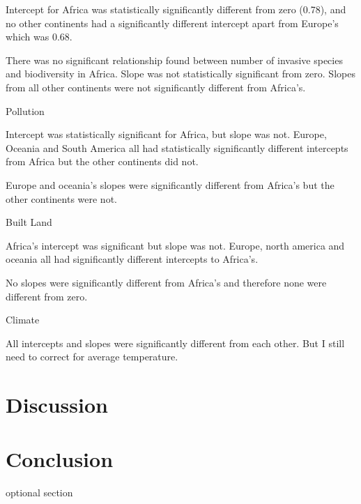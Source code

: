 \documentclass[11pt, a4paper, titlepage]{article}
\begin{document}
Intercept for Africa was statistically significantly different from zero (0.78), and no other continents had a significantly different intercept apart from Europe's which was 0.68. 

There was no significant relationship found between number of invasive species and biodiversity in Africa. Slope was not statistically significant from zero. Slopes from all other continents were not significantly different from Africa's. \newline

Pollution \newline

Intercept was statistically significant for Africa, but slope was not. Europe, Oceania and South America all had statistically significantly different intercepts from Africa but the other continents did not.

Europe and oceania's slopes were significantly different from Africa's but the other continents were not. \newline

Built Land \newline

Africa's intercept was significant but slope was not. Europe, north america and oceania all had significantly different intercepts to Africa's.

No slopes were significantly different from Africa's and therefore none were different from zero. \newline

Climate \newline

All intercepts and slopes were significantly different from each other. But I still need to correct for average temperature.
 
	 
	 
	 

    \clearpage
    
     \section*{Discussion}
     
     \clearpage
     
     \section*{Conclusion }
     optional section
     \clearpage
    
\end{document}

